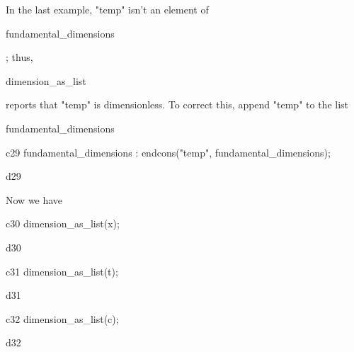 \documentclass[12pt]{article}
\begin{document}
\vspace{0.1in}

\noindent In the last example, "temp" isn't an element of
\begin{verb} fundamental_dimensions \end{verb}; thus,  
\begin{verb} dimension_as_list \end{verb} 
reports that "temp" is dimensionless. To correct this, append "temp" to the list 
\begin{verb} fundamental_dimensions \end{verb}

\vspace{0.1in}



\begin{mcline}{c29}
fundamental_dimensions : endcons("temp", fundamental_dimensions);
\end{mcline}



\begin{mdline}{d29}
\end{mdline}


\vspace{0.1in}

\noindent Now we have

\vspace{0.1in}



\begin{mcline}{c30}
dimension_as_list(x);
\end{mcline}



\begin{mdline}{d30}
\left[ 0,1,0,0 \right] 
\end{mdline}

\begin{mcline}{c31}
dimension_as_list(t);
\end{mcline}



\begin{mdline}{d31}
\left[ 0,0,1,0 \right] 
\end{mdline}

\begin{mcline}{c32}
dimension_as_list(c);
\end{mcline}



\begin{mdline}{d32}
\left[ 0,1,-1,0 \right] 
\end{mdline}
\end{document}
